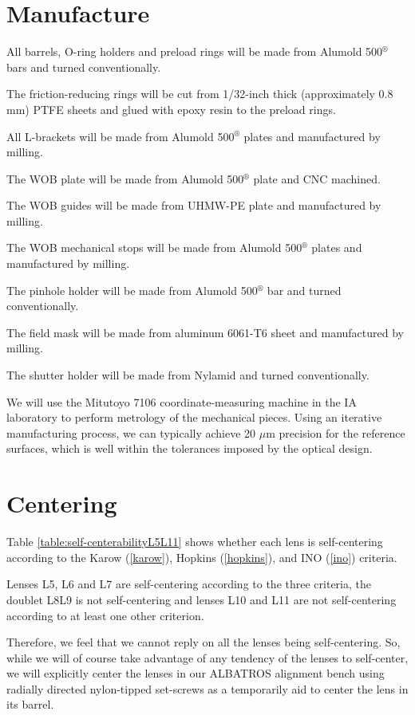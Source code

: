 \documentclass{report}
\begin{document}
\section{Manufacture}
 
All barrels, O-ring holders and preload rings will be made from Alumold 500${}^\circledR$ bars and turned conventionally. 

The friction-reducing rings will be cut from 1/32-inch thick (approximately 0.8 mm) PTFE sheets and glued with epoxy resin to the preload rings.

All L-brackets will be made from Alumold 500${}^\circledR$ plates and manufactured by milling.

The WOB plate will be made from Alumold 500${}^\circledR$ plate and CNC machined.

The WOB guides will be made from UHMW-PE plate and manufactured by milling.

The WOB mechanical stops will be made from Alumold 500${}^\circledR$ plates and manufactured by milling.

The pinhole holder will be made from Alumold 500${}^\circledR$ bar and turned conventionally. 

The field mask will be made from aluminum 6061-T6 sheet and manufactured by milling.

The shutter holder will be made from Nylamid and turned conventionally.

We will use the Mitutoyo 7106 coordinate-measuring machine in the IA laboratory to perform metrology of the mechanical pieces. Using an iterative manufacturing process, we can typically achieve 20 $\mu$m precision for the reference surfaces, which is well within the tolerances imposed by the optical design.

\section{Centering}

Table \ref{table:self-centerabilityL5L11} shows whether each lens is self-centering according to the Karow (\ref{karow}), Hopkins (\ref{hopkins}), and INO (\ref{ino}) criteria. 

Lenses L5, L6 and L7 are self-centering according to the three criteria, the doublet L8L9 is not self-centering and lenses L10 and L11 are not self-centering according to at least one other criterion.

Therefore, we feel that we cannot reply on all the lenses being self-centering.
So, while we will of course take advantage of any tendency of the lenses to self-center, we will explicitly center the lenses in our ALBATROS alignment bench using radially directed nylon-tipped set-screws as a temporarily aid to center the lens in its barrel. 
\end{document}
